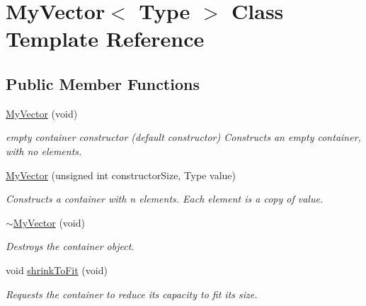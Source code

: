\hypertarget{classMyVector}{}\section{My\+Vector$<$ Type $>$ Class Template Reference}
\label{classMyVector}
\subsection*{Public Member Functions}
\begin{DoxyCompactItemize}
\item 
\mbox{\label{classMyVector_a3bb5bec961c41c42ba7b961af3743471}} 
\hyperlink{classMyVector_a3bb5bec961c41c42ba7b961af3743471}{My\+Vector} (void)
\begin{DoxyCompactList}\small\item\em empty container constructor (default constructor) Constructs an empty container, with no elements. \end{DoxyCompactList}\item 
\mbox{\label{classMyVector_a6f41f6e8183a1234adf5c71705fb9a98}} 
\hyperlink{classMyVector_a6f41f6e8183a1234adf5c71705fb9a98}{My\+Vector} (unsigned int constructor\+Size, Type value)
\begin{DoxyCompactList}\small\item\em Constructs a container with n elements. Each element is a copy of value. \end{DoxyCompactList}\item 
\mbox{\label{classMyVector_a90d73cfe8e96e8db68f681ce01a9ff66}} 
\hyperlink{classMyVector_a90d73cfe8e96e8db68f681ce01a9ff66}{$\sim$\+My\+Vector} (void)
\begin{DoxyCompactList}\small\item\em Destroys the container object. \end{DoxyCompactList}\item 
\mbox{\label{classMyVector_abf42d6f142589ab76efd8e8050c2f12c}} 
void \hyperlink{classMyVector_abf42d6f142589ab76efd8e8050c2f12c}{shrink\+To\+Fit} (void)
\begin{DoxyCompactList}\small\item\em Requests the container to reduce its capacity to fit its size. \end{DoxyCompactList}\item 

\end{DoxyCompactItemize}
